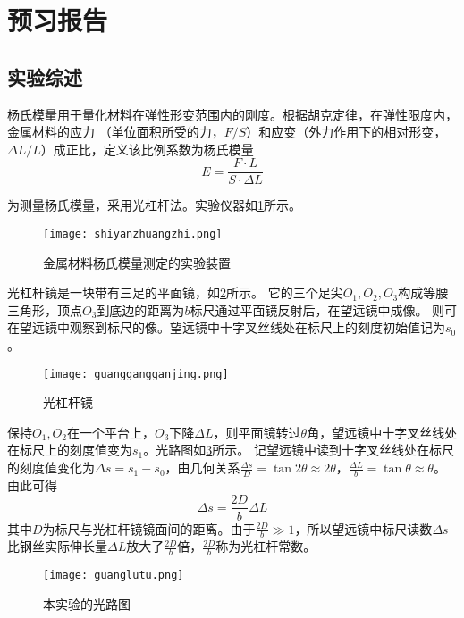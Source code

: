 \documentclass[]{../template/Report}%
\begin{document}
\maketitle%

\section{预习报告}
\subsection{实验综述}
杨氏模量用于量化材料在弹性形变范围内的刚度。根据胡克定律，在弹性限度内，金属材料的应力
（单位面积所受的力，$F/S$）和应变（外力作用下的相对形变，$\Delta L /L$）成正比，定义该比例系数为杨氏模量
\[E = \frac{F \cdot L}{S \cdot \Delta L}\]

为测量杨氏模量，采用光杠杆法。实验仪器如\cref{shiyanzhuangzhi}所示。

\begin{figure}[htbp]
    \centering
    \texttt{[image: shiyanzhuangzhi.png]}
    \caption{金属材料杨氏模量测定的实验装置}
    \label{shiyanzhuangzhi}
\end{figure}

光杠杆镜是一块带有三足的平面镜，如\cref{guanggangganjing}所示。
它的三个足尖$O_1,O_2,O_3$构成等腰三角形，顶点$O_3$到底边的距离为$b$标尺通过平面镜反射后，在望远镜中成像。
则可在望远镜中观察到标尺的像。望远镜中十字叉丝线处在标尺上的刻度初始值记为$s_0$。

\begin{figure}[htbp]
    \centering
    \texttt{[image: guanggangganjing.png]}
    \caption{光杠杆镜}
    \label{guanggangganjing}
\end{figure}

保持$O_1,O_2$在一个平台上，$O_3$下降$\Delta L$，则平面镜转过$\theta$角，望远镜中十字叉丝线处在标尺上的刻度值变为$s_1$。光路图如\cref{guanglutu}所示。
记望远镜中读到十字叉丝线处在标尺的刻度值变化为$\Delta s = s_1 - s_0$，由几何关系$\frac{\Delta s}{D} = \tan 2 \theta \approx 2 \theta$，$\frac{\Delta L}{b} = \tan \theta \approx \theta$。
由此可得
\[\Delta s = \frac{2D}{b} \Delta L\]
其中$D$为标尺与光杠杆镜镜面间的距离。由于$\frac{2D}{b} \gg 1$，所以望远镜中标尺读数$\Delta s$比钢丝实际伸长量$\Delta L$放大了$\frac{2D}{b}$倍，$\frac{2D}{b}$称为光杠杆常数。

\begin{figure}[htbp]
    \centering
    \texttt{[image: guanglutu.png]}
    \caption{本实验的光路图}
    \label{guanglutu}
\end{figure}
\end{document}
